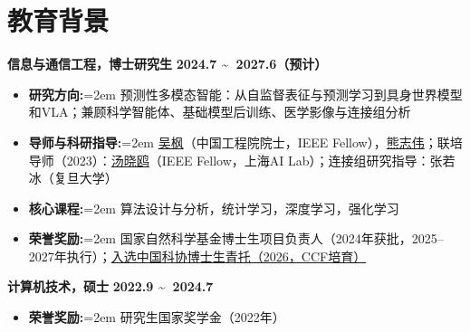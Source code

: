 \documentclass{resume}
\begin{document}
\section{\makebox[.75em][c]{\faGraduationCap} \textbf{\fangsong 教育背景}}
\begin{flushleft}
\textbf{\fangsong 信息与通信工程，博士研究生} \hfill \textbf{2024.7 \textasciitilde\ 2027.6（预计）}
\end{flushleft}
\begin{itemize}
    \item \textbf{\kaishu 研究方向:}\hangindent=2em
    \kaishu 预测性多模态智能：从自监督表征与预测学习到具身世界模型和VLA；兼顾科学智能体、基础模型后训练、医学影像与连接组分析
    \item \textbf{\kaishu 导师与科研指导:}\hangindent=2em
    \kaishu \href{https://scholar.google.com/citations?user=5bInRDEAAAAJ&hl=en}{吴枫}（中国工程院院士，IEEE Fellow），\href{https://scholar.google.com/citations?user=Snl0HPEAAAAJ&hl=en&oi=ao}{熊志伟}；联培导师（2023）：\href{https://scholar.google.com/citations?user=qpBtpGsAAAAJ&hl=en}{汤晓鸥}（IEEE Fellow，上海AI Lab）；连接组研究指导：张若冰（复旦大学）
    \item \textbf{\kaishu 核心课程:}\hangindent=2em
    \kaishu 算法设计与分析，统计学习，深度学习，强化学习
    \item \textbf{\kaishu 荣誉奖励:}\hangindent=2em
    \kaishu 国家自然科学基金博士生项目负责人（2024年获批，2025--2027年执行）；\href{https://ydchen0806.github.io/docs/cast_ccf_2026_selection_proof.png}{入选中国科协博士生青托（2026，CCF培育）}
\end{itemize}

\begin{flushleft}
\textbf{\fangsong 计算机技术，硕士} \hfill \textbf{2022.9 \textasciitilde\ 2024.7}
\end{flushleft}
\begin{itemize}
    \item \textbf{\kaishu 荣誉奖励:}\hangindent=2em
    \kaishu 研究生国家奖学金（2022年）
\end{itemize}
\end{document}
